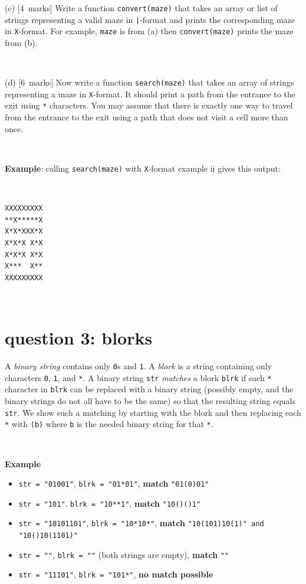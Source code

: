 \documentclass[12pt]{article}
\newcommand{\mymarks}[1]{\mbox{\small [#1 marks]}}
\begin{document}
\newpage
(c) \mymarks{4}
Write a function \texttt{convert(maze)} that takes an array or list of strings representing a valid maze in \verb&|&-format and 
prints the corresponding maze in \verb&X&-format. 
For example, \texttt{maze} is from (a) then
\texttt{convert(maze)} prints the maze from (b).

~

(d) \mymarks{6}
Now write a function \verb&search(maze)& 
that takes an array of strings representing a maze in \verb&X&-format.
It should print a path from the entrance to the exit using 
\verb&*& characters. 
You may assume that there is exactly one way to travel from the entrance
to the exit using a path that does not visit a cell more than once.

~

\noindent
\begin{minipage}[c]{13cm}
{\bf Example}: calling \texttt{search(maze)} with \verb&X&-format 
example ii gives this output:
\end{minipage}~ ~ ~
\begin{minipage}[c]{4cm}
{\small\begin{verbatim}
XXXXXXXXX
**X*****X
X*X*XXX*X
X*X*X X*X
X*X*X X*X
X***  X**
XXXXXXXXX
\end{verbatim}}
\end{minipage}
\vfill~


\newpage
\section*{question 3: blorks}

A {\em binary string} contains only \verb&0&s and \verb&1&.
A {\em blork} is a string containing only characters \verb&0&, \verb&1&, and \verb&*&. 
A binary string \verb&str& {\em matches} a blork \verb&blrk&
if each \verb&*& character in \verb&blrk& 
can be replaced with a binary string (possibly empty, and the
binary strings do not all have to be the same)
so that the resulting string equals \verb&str&. 
We show such a matching by 
starting with the blork and then
replacing each \verb&*& with \verb&(b)& where \verb&b& is
the needed binary string for that \verb&*&.

~

\noindent
{\bf Example}
\begin{itemize}
\item \verb&str = "01001"&, \verb&blrk = "01*01"&,
{\bf match} \verb&"01(0)01"&
\item \verb&str = "101"&, \verb&blrk = "10**1"&, 
{\bf match} \verb&"10()()1"&
\item \verb&str = "10101101"&, \verb&blrk = "10*10*"&, 
{\bf match} \verb&"10(101)10(1)" and "10()10(1101)"&
\item \verb&str = ""&, \verb&blrk = ""& (both strings are empty), 
{\bf match} \verb&""&
\item \verb&str = "11101"&, \verb&blrk = "101*"&, {\bf no match possible}
\end{itemize}
\end{document}

